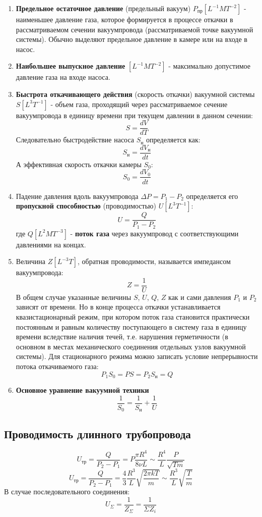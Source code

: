 \documentclass[a4paper, 12pt]{article}%
\begin{document}
\begin{enumerate}
\item \textbf{Предельное остаточное давление} (предельный вакуум) $P_{\text{пр}} [L^{-1}MT^{-2}]$ - наименьшее давление газа, которое формируется в процессе откачки в рассматриваемом сечении вакуумпровода (рассматриваемой точке вакуумной системы). Обычно выделяют предельное давление в камере или на входе в насос.
\item \textbf{Наибольшее выпускное давление} $[L^{-1}MT^{-2}]$ - максимально допустимое давление газа на входе насоса.
\item \textbf{Быстрота откачивающего действия} (скорость откачки) вакуумной системы $S [L^3T^{-1}]$ - объем газа, проходящий через рассматриваемое сечение вакуумпровода в единицу времени при текущем давлении в данном сечении:
\[S = \dfrac{dV}{dT}\]
Следовательно быстродействие насоса $S_{\text{н}}$ определяется как:
\[ S_{ \text{н} } = \dfrac{dV_{ \text{н} }}{ dt } \]
А эффективная скорость откачки камеры $S_0$:
\[S_0 = \dfrac{ dV_0 }{ dt } \]
\item Падение давления вдоль вакуумпровода $ \Delta P = P_1 - P_2 $ определяется его \textbf{пропускной способностью} (проводимостью) $ U [L^3 T^{-1} ] $:
\[ U = \dfrac{Q}{P_1 - P_2} \]
где $Q [L^2 M T^{-3}]$ - \textbf{поток газа} через вакуумпровод с соответствующими давлениями на концах.
\item Величина $Z [L^{-3}T]$, обратная проводимости, называется импедансом вакуумпровода:
\[Z=\dfrac{1}{U}\]
В общем случае указанные величины $S$, $U$, $Q$, $Z$ как и сами давления $P_1$ и $P_2$ зависят от времени. Но в конце процесса откачки устанавливается квазистационарный режим, при котором поток газа становится практически постоянным и равным количеству поступающего в систему газа в единицу времени вследствие наличия течей, т.е. нарушения герметичности (в основном в местах механического соединения отдельных узлов вакуумной системы). Для стационарного режима можно записать условие непрерывности потока откачиваемого газа:
\[P_1 S_0 = PS = P_2 S_{\text{н}} = Q \]
\item \textbf{Основное уравнение вакуумной техники}
\[\dfrac{1}{S_0} = \dfrac{1}{S_{ \text{н} }} + \dfrac{1}{U}\]
\end{enumerate}
\subsection*{Проводимость длинного трубопровода}
\[U_{\text{тр}} = \dfrac{Q}{P_2 - P_1} = P\dfrac{\pi R^4}{8 \nu L} \sim \dfrac{R^4}{L} \dfrac{P}{\sqrt{Tm}}\]
\[U_{\text{тр}} = \dfrac{Q}{P_2 - P_1} = \dfrac{4}{3} \dfrac{R^3}{L}\sqrt{\dfrac{2 \pi k T}{m}} \sim \dfrac{R^3}{L} \sqrt{\dfrac{T}{m}} \]
В случае последовательного соединения:
\[U_{\Sigma} = \dfrac{1}{Z_{\Sigma}} = \dfrac{1}{\Sigma Z_i}\]
\end{document}
